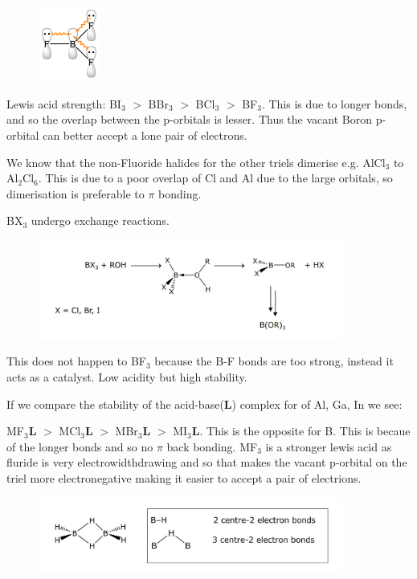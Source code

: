 \documentclass{article}
\newcommand{\sub}[1]{\(_#1\)}
\begin{document}
    \begin{figure}[h]
        \centering
        \includegraphics[width=2cm]{bf3.png}
    \end{figure}

    Lewis acid strength: BI\sub{3} $>$ BBr\sub{3} $>$ BCl\sub{3} $>$ BF\sub{3}.
    This is due to longer bonds, and so the overlap between the p-orbitals is lesser. Thus the vacant Boron 
    p-orbital can better accept a lone pair of electrons. 

    We know that the non-Fluoride halides for the other triels dimerise e.g. AlCl\sub{3} to Al\sub{2}Cl\sub{6}.
    This is due to a poor overlap of Cl and Al due to the large orbitals, so dimerisation is preferable to $\pi$ bonding.

    BX\sub{3} undergo exchange reactions. 
    \begin{figure}[h]
        \centering
        \includegraphics[width=10cm]{ex.jpg}
    \end{figure}

    This does not happen to BF\sub{3} because the B-F bonds are too strong, instead it acts as a catalyst.
    Low acidity but high stability. 

    If we compare the stability of the acid-base(\textbf{L}) complex for  of Al, Ga, In we see:
    
    MF\sub{3}\textbf{L} $>$ MCl\sub{3}\textbf{L} $>$ MBr\sub{3}\textbf{L} $>$ MI\sub{3}\textbf{L}. This is the opposite
    for B. This is becaue of the longer bonds and so no $\pi$ back bonding. MF\sub{3} is a stronger lewis acid as 
    fluride is very electrowidthdrawing and so that makes the vacant p-orbital on the triel more electronegative
    making it easier to accept a pair of electrions.

    \begin{figure}[h]
        \centering
        \includegraphics[width=10cm]{b2h6.jpg}
    \end{figure}
\end{document}
